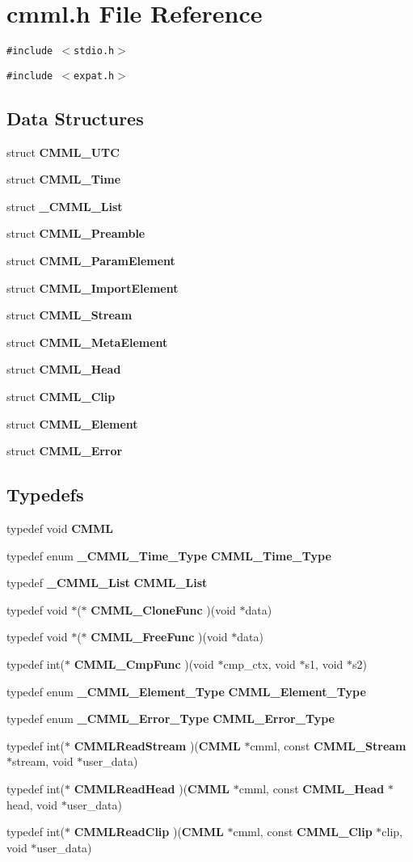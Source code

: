 \section{cmml.h File Reference}
\label{cmml_8h}
{\tt \#include $<$stdio.h$>$}\par
{\tt \#include $<$expat.h$>$}\par
\subsection*{Data Structures}
\begin{CompactItemize}
\item 
struct {\bf CMML\_\-UTC}
\item 
struct {\bf CMML\_\-Time}
\item 
struct {\bf \_\-CMML\_\-List}
\item 
struct {\bf CMML\_\-Preamble}
\item 
struct {\bf CMML\_\-Param\-Element}
\item 
struct {\bf CMML\_\-Import\-Element}
\item 
struct {\bf CMML\_\-Stream}
\item 
struct {\bf CMML\_\-Meta\-Element}
\item 
struct {\bf CMML\_\-Head}
\item 
struct {\bf CMML\_\-Clip}
\item 
struct {\bf CMML\_\-Element}
\item 
struct {\bf CMML\_\-Error}
\end{CompactItemize}
\subsection*{Typedefs}
\begin{CompactItemize}
\item 
typedef void {\bf CMML}
\item 
typedef enum {\bf \_\-CMML\_\-Time\_\-Type} {\bf CMML\_\-Time\_\-Type}
\item 
typedef {\bf \_\-CMML\_\-List} {\bf CMML\_\-List}
\item 
typedef void $\ast$($\ast$ {\bf CMML\_\-Clone\-Func} )(void $\ast$data)
\item 
typedef void $\ast$($\ast$ {\bf CMML\_\-Free\-Func} )(void $\ast$data)
\item 
typedef int($\ast$ {\bf CMML\_\-Cmp\-Func} )(void $\ast$cmp\_\-ctx, void $\ast$s1, void $\ast$s2)
\item 
typedef enum {\bf \_\-CMML\_\-Element\_\-Type} {\bf CMML\_\-Element\_\-Type}
\item 
typedef enum {\bf \_\-CMML\_\-Error\_\-Type} {\bf CMML\_\-Error\_\-Type}
\item 
typedef int($\ast$ {\bf CMMLRead\-Stream} )({\bf CMML} $\ast$cmml, const {\bf CMML\_\-Stream} $\ast$stream, void $\ast$user\_\-data)
\item 
typedef int($\ast$ {\bf CMMLRead\-Head} )({\bf CMML} $\ast$cmml, const {\bf CMML\_\-Head} $\ast$head, void $\ast$user\_\-data)
\item 
typedef int($\ast$ {\bf CMMLRead\-Clip} )({\bf CMML} $\ast$cmml, const {\bf CMML\_\-Clip} $\ast$clip, void $\ast$user\_\-data)
\end{CompactItemize}
